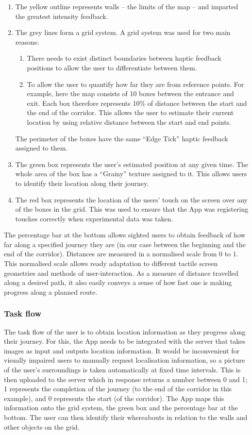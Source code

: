 \begin{enumerate}
  \item The yellow outline represents walls -- the limits of the map -- and imparted the greatest intensity feedback.
  \item The grey lines form a grid system. A grid system was used for two main reasons:
  \begin{enumerate}
  \item There needs to exist distinct boundaries between haptic feedback positions to allow the user to differentiate between them.
  \item To allow the user to quantify how far they are from reference points. For example, here the map consists of 10 boxes between the entrance and exit. Each box therefore represents 10\% of distance between the start and the end of the corridor. This allows the user to estimate their current location by using relative distance between the start and end points.
  \end{enumerate}
  The perimeter of the boxes have the same ``Edge Tick'' haptic feedback assigned to them.
  \item The green box represents the user's estimated position at any given time. The whole area of the box has a ``Grainy'' texture assigned to it. This allows users to identify their location along their journey.
  \item The red box represents the location of the users' touch on the screen over any of the boxes in the grid. This was used to ensure that the App was registering touches correctly when experimental data was taken.
\end{enumerate} 

The percentage bar at the bottom allows sighted users to obtain feedback of how far along a specified journey they are (in our case between the beginning and the end of the corridor). Distances are measured in a normalised scale from $0$ to $1$. This normalised scale allows ready adaptation to different tactile screen geometries and methods of user-interaction. As a measure of distance travelled along a desired path, it also easily conveys a sense of how fast one is making progress along a planned route.


\subsubsection{Task flow}
\label{sec:task_flow}
The task flow of the user is to obtain location information as they progress along their journey. For this, the App needs to be integrated with the server that takes images as input and outputs location information. It would be inconvenient for visually impaired users to manually request localisation information, so a picture of the user's surroundings is taken automatically at fixed time intervals. This is then uploaded to the server which in response returns a number between 0 and 1; 1 represents the completion of the journey (to the end of the corridor in this example), and 0 represents the start (of the corridor). The App maps this information onto the grid system, the green box and the percentage bar at the bottom. The user can then identify their whereabouts in relation to the walls and other objects on the grid.
 
